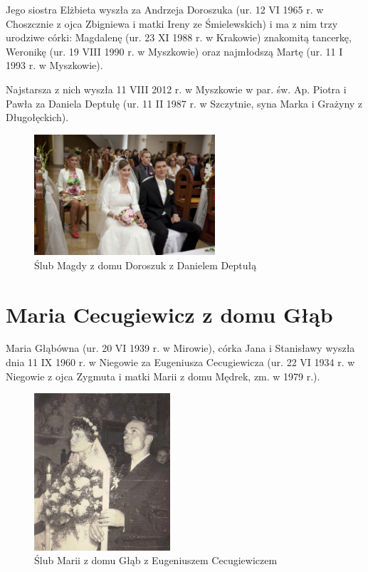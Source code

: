 Jego siostra Elżbieta wyszła za Andrzeja Doroszuka (ur. 12 VI 1965 r. w Choszcznie z ojca Zbigniewa i matki Ireny ze Śmielewskich) i ma z nim trzy urodziwe córki: Magdalenę (ur. 23 XI 1988 r. w Krakowie) znakomitą tancerkę, Weronikę (ur. 19 VIII 1990 r. w Myszkowie) oraz najmłodszą Martę (ur. 11 I 1993 r. w Myszkowie).

Najstarsza z nich wyszła 11 VIII 2012 r. w Myszkowie w par. św. Ap. Piotra i Pawła za Daniela Deptułę (ur. 11 II 1987 r. w Szczytnie, syna Marka i Grażyny z Długołęckich).


\begin{figure}[!h]
\begin{center}
\includegraphics[width=0.6\textwidth]{zdjecia/slub_magdy_i_daniela_deptulow.jpg}
\caption{Ślub Magdy z domu Doroszuk z Danielem Deptułą}
\label{rys:slub_magdy_i_daniela_deptulow}
\end{center}
\end{figure}


\section{Maria Cecugiewicz z domu Głąb}

Maria Głąbówna (ur. 20 VI 1939 r. w Mirowie), córka Jana i Stanisławy wyszła dnia 11 IX 1960 r. w Niegowie za Eugeniusza Cecugiewicza (ur. 22 VI 1934 r. w Niegowie z ojca Zygmuta i matki Marii z domu Mędrek, zm. w 1979 r.).

\begin{figure}[!h]
\begin{center}
\includegraphics[width=0.45\textwidth]{zdjecia/slub_marii_i_eugeniusza_cecugiewiczow.jpg}
\caption{Ślub Marii z domu Głąb z Eugeniuszem Cecugiewiczem}
\label{rys:slub_marii_i_eugeniusza_cecugiewiczow}
\end{center}
\end{figure}

